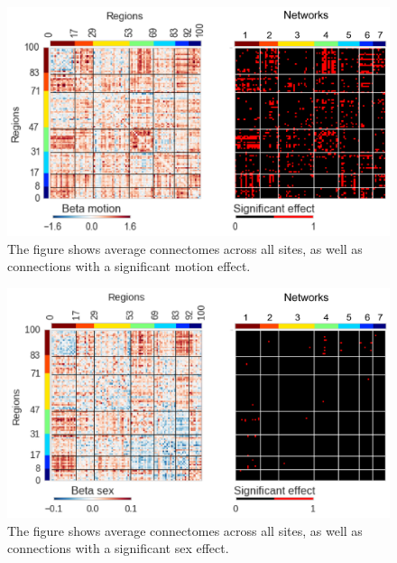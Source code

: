 \documentclass[authoryear]{elsarticle}
\begin{document}
\begin{figure}[htbp]
\begin{center}
\includegraphics[width=\linewidth]{../figures/effect_motion.png}
\end{center}
\caption[Connectome variability across sites]{
The figure shows average connectomes across all sites, as well as connections with a significant motion effect.
}
\label{fig_connectome_variability_motion}
\end{figure}

\begin{figure}[htbp]
\begin{center}
\includegraphics[width=\linewidth]{../figures/effect_sex.png}
\end{center}
\caption[Connectome variability across sites]{
The figure shows average connectomes across all sites, as well as connections with a significant sex effect.
}
\label{fig_connectome_variability_sex}
\end{figure}
\end{document}
